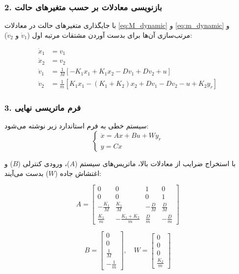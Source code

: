 \documentclass[a4paper]{article}
\begin{document}
	\subsubsection*{2. بازنویسی معادلات بر حسب متغیرهای حالت}
	با جایگذاری متغیرهای حالت در معادلات \eqref{eq:M_dynamic} و \eqref{eq:m_dynamic} و مرتب‌سازی آن‌ها برای بدست آوردن مشتقات مرتبه اول ($\dot{v}_1$ و $\dot{v}_2$):
	
	\begin{align}
		\dot{x}_1 &= v_1 \\
		\dot{x}_2 &= v_2 \\
		\dot{v}_1 &= \frac{1}{M} \left[ -K_1 x_1 + K_1 x_2 - D v_1 + D v_2 + u \right] \\
		\dot{v}_2 &= \frac{1}{m} \left[ K_1 x_1 - (K_1 + K_2) x_2 + D v_1 - D v_2 - u + K_2 y_r \right]
	\end{align}
	
	\subsubsection*{3. فرم ماتریسی نهایی}
	سیستم خطی به فرم استاندارد زیر نوشته می‌شود:
	\begin{equation}
		\begin{cases}
			\dot{x} = A x + B u + W y_r \\
			y = C x
		\end{cases}
	\end{equation}
	
	با استخراج ضرایب از معادلات بالا، ماتریس‌های سیستم ($A$)، ورودی کنترلی ($B$) و اغتشاش جاده ($W$) بدست می‌آیند:
	
	\[
	A = \begin{bmatrix} 
		0 & 0 & 1 & 0 \\
		0 & 0 & 0 & 1 \\
		-\frac{K_1}{M} & \frac{K_1}{M} & -\frac{D}{M} & \frac{D}{M} \\
		\frac{K_1}{m} & -\frac{K_1+K_2}{m} & \frac{D}{m} & -\frac{D}{m}
	\end{bmatrix}
	\]
	
	\[
	B = \begin{bmatrix} 0 \\ 0 \\ \frac{1}{M} \\ -\frac{1}{m} \end{bmatrix}, \quad
	W = \begin{bmatrix} 0 \\ 0 \\ 0 \\ \frac{K_2}{m} \end{bmatrix}
	\]
	
\end{document}
